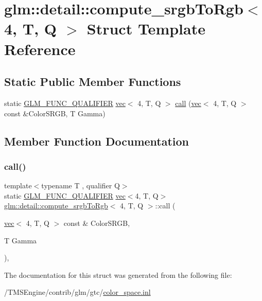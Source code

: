 \hypertarget{structglm_1_1detail_1_1compute__srgb_to_rgb_3_014_00_01_t_00_01_q_01_4}{}\section{glm\+:\+:detail\+:\+:compute\+\_\+srgb\+To\+Rgb$<$ 4, T, Q $>$ Struct Template Reference}
\label{structglm_1_1detail_1_1compute__srgb_to_rgb_3_014_00_01_t_00_01_q_01_4}
\subsection*{Static Public Member Functions}
\begin{DoxyCompactItemize}
\item 
static \hyperlink{setup_8hpp_a33fdea6f91c5f834105f7415e2a64407}{G\+L\+M\+\_\+\+F\+U\+N\+C\+\_\+\+Q\+U\+A\+L\+I\+F\+I\+ER} \hyperlink{structglm_1_1vec}{vec}$<$ 4, T, Q $>$ \hyperlink{structglm_1_1detail_1_1compute__srgb_to_rgb_3_014_00_01_t_00_01_q_01_4_abda95674c23692a1c21f2d141ca2e024}{call} (\hyperlink{structglm_1_1vec}{vec}$<$ 4, T, Q $>$ const \&Color\+S\+R\+GB, T Gamma)
\end{DoxyCompactItemize}


\subsection{Member Function Documentation}
\mbox{\label{structglm_1_1detail_1_1compute__srgb_to_rgb_3_014_00_01_t_00_01_q_01_4_abda95674c23692a1c21f2d141ca2e024}} 
\subsubsection{\texorpdfstring{call()}{call()}}
{\footnotesize\ttfamily template$<$typename T , qualifier Q$>$ \\
static \hyperlink{setup_8hpp_a33fdea6f91c5f834105f7415e2a64407}{G\+L\+M\+\_\+\+F\+U\+N\+C\+\_\+\+Q\+U\+A\+L\+I\+F\+I\+ER} \hyperlink{structglm_1_1vec}{vec}$<$4, T, Q$>$ \hyperlink{structglm_1_1detail_1_1compute__srgb_to_rgb}{glm\+::detail\+::compute\+\_\+srgb\+To\+Rgb}$<$ 4, T, Q $>$\+::call (\begin{DoxyParamCaption}\item[{\hyperlink{structglm_1_1vec}{vec}$<$ 4, T, Q $>$ const \&}]{Color\+S\+R\+GB,  }\item[{T}]{Gamma }\end{DoxyParamCaption})\hspace{0.3cm}{\ttfamily [inline]}, {\ttfamily [static]}}



The documentation for this struct was generated from the following file\+:\begin{DoxyCompactItemize}
\item 
/\+T\+M\+S\+Engine/contrib/glm/gtc/\hyperlink{gtc_2color__space_8inl}{color\+\_\+space.\+inl}\end{DoxyCompactItemize}
